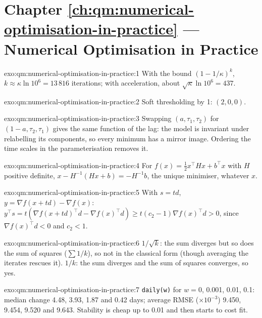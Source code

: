 \section*{Chapter \ref{ch:qm:numerical-optimisation-in-practice} --- Numerical Optimisation in Practice}

\begin{solution}{exo:qm:numerical-optimisation-in-practice:1}
With the bound $(1 - 1/\kappa)^k$, $k \approx \kappa\ln10^6 = 13\,816$ iterations; with acceleration, about $\sqrt\kappa\ln10^6 = 437$.
\end{solution}

\begin{solution}{exo:qm:numerical-optimisation-in-practice:2}
Soft thresholding by 1: $(2, 0, 0)$.
\end{solution}

\begin{solution}{exo:qm:numerical-optimisation-in-practice:3}
Swapping $(a, \tau_1, \tau_2)$ for $(1 - a, \tau_2, \tau_1)$ gives the same function of the lag: the model is invariant under relabelling its components, so every minimum has a mirror image.
Ordering the time scales in the parameterisation removes it.
\end{solution}

\begin{solution}{exo:qm:numerical-optimisation-in-practice:4}
For $f(x) = \frac12x^\top Hx + b^\top x$ with $H$ positive definite, $x - H^{-1}(Hx + b) = -H^{-1}b$, the unique minimiser, whatever $x$.
\end{solution}

\begin{solution}{exo:qm:numerical-optimisation-in-practice:5}
With $s = td$, $y = \nabla f(x + td) - \nabla f(x)$: $y^\top s = t(\nabla f(x + td)^\top d - \nabla f(x)^\top d) \ge t(c_2 - 1)\nabla f(x)^\top d > 0$, since $\nabla f(x)^\top d < 0$ and $c_2 < 1$.
\end{solution}

\begin{solution}{exo:qm:numerical-optimisation-in-practice:6}
$1/\sqrt k$: the sum diverges but so does the sum of squares ($\sum1/k$), so not in the classical form (though averaging the iterates rescues it). $1/k$: the sum diverges and the sum of squares
converges, so yes.
\end{solution}

\begin{solution}{exo:qm:numerical-optimisation-in-practice:7}
\texttt{daily(w)} for $w = 0$, 0.001, 0.01, 0.1: median change 4.48, 3.93, 1.87 and 0.42 days; average RMSE ($\times 10^{-3}$) 9.450, 9.454, 9.520 and 9.643. Stability is cheap up to 0.01 and then starts to
cost fit.
\end{solution}

